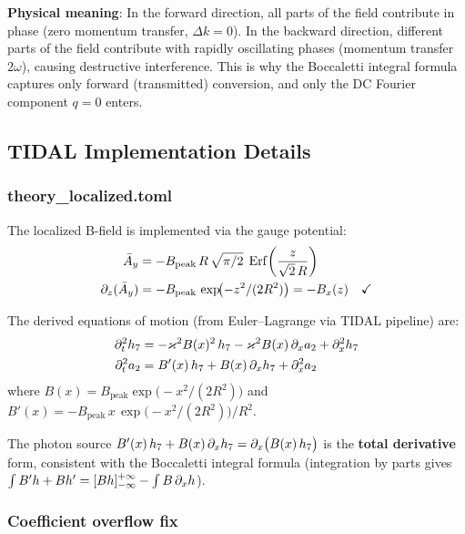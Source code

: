 \textbf{Physical meaning}: In the forward direction, all parts of the field contribute in phase
(zero momentum transfer, $\Delta k = 0$). In the backward direction, different parts of the field
contribute with rapidly oscillating phases (momentum transfer $2\omega$), causing destructive
interference. This is why the Boccaletti integral formula captures only forward (transmitted)
conversion, and only the DC Fourier component $q=0$ enters.


\subsection{TIDAL Implementation Details}
\label{sec:localized-implementation}

\subsubsection{theory\_localized.toml}
\label{sec:theory-localized-toml}

The localized B-field is implemented via the gauge potential:
\begin{align}
  \bar{A}_y &= -B_\text{peak}\, R\, \sqrt{\pi/2}\; \operatorname{Erf}\!\left(\frac{z}{\sqrt{2}\,R}\right) \notag \\
  \partial_z(\bar{A}_y) &= -B_\text{peak}\, \exp\!\bigl(-z^2/(2R^2)\bigr) = -B_x(z) \quad \checkmark \notag
\end{align}

The derived equations of motion (from Euler--Lagrange via TIDAL pipeline) are:
\begin{align}
  \partial_t^2 h_7 &= -\varkappa^2 B(x)^2\, h_7 - \varkappa^2 B(x)\, \partial_x a_2 + \partial_x^2 h_7 \label{eq:eom-h7-loc} \\
  \partial_t^2 a_2 &= B'(x)\, h_7 + B(x)\, \partial_x h_7 + \partial_x^2 a_2 \label{eq:eom-a2-loc}
\end{align}
where $B(x) = B_\text{peak} \exp\!\bigl(-x^2/(2R^2)\bigr)$ and $B'(x) = -B_\text{peak}\, x\, \exp\!\bigl(-x^2/(2R^2)\bigr)/R^2$.

The photon source $B'(x)\, h_7 + B(x)\, \partial_x h_7 = \partial_x\bigl(B(x)\, h_7\bigr)$ is the \textbf{total derivative}
form, consistent with the Boccaletti integral formula (integration by parts gives $\int B'h + Bh'
= [Bh]_{-\infty}^{+\infty} - \int B\, \partial_x h$).

\subsubsection{Coefficient overflow fix}
\label{sec:coeff-overflow}

